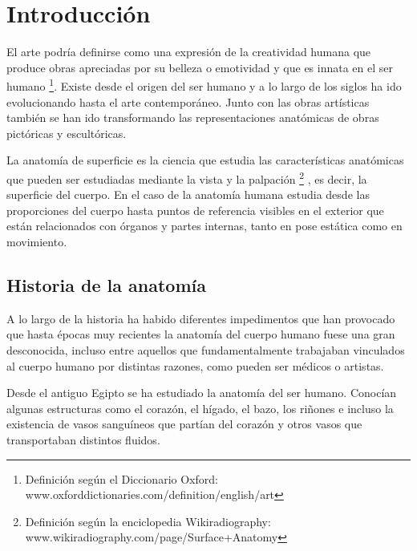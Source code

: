 \section{Introducción} %
El arte podría definirse como una expresión de la creatividad humana que produce obras apreciadas por su belleza o emotividad y que es innata en el ser humano \footnote{Definición según el Diccionario Oxford: www.oxforddictionaries.com/definition/english/art}. Existe desde el origen del ser humano y  %
a lo largo de los siglos ha ido evolucionando hasta el arte contemporáneo. Junto con las obras artísticas también se han ido transformando las representaciones anatómicas de obras pictóricas y escultóricas.

La anatomía de superficie es la ciencia que estudia las características anatómicas que pueden ser estudiadas mediante la vista y la palpación \footnote{Definición según la enciclopedia Wikiradiography: www.wikiradiography.com/page/Surface+Anatomy}%
, es decir, la superficie del cuerpo. En el caso de la anatomía humana estudia desde las proporciones del cuerpo hasta puntos de referencia visibles en el exterior que están relacionados con órganos y partes internas, tanto en pose estática como en movimiento. %

\subsection{Historia de la anatomía}
A lo largo de la historia ha habido diferentes impedimentos que han provocado que hasta épocas muy recientes la anatomía del cuerpo humano fuese una gran desconocida, incluso entre aquellos que fundamentalmente trabajaban vinculados al cuerpo humano por distintas razones, como pueden ser médicos o artistas.

Desde el antiguo Egipto se ha estudiado la anatomía del ser humano. Conocían algunas estructuras como el corazón, el hígado, el bazo, los riñones e incluso la existencia de vasos sanguíneos que partían del corazón y otros vasos que transportaban distintos fluidos.

